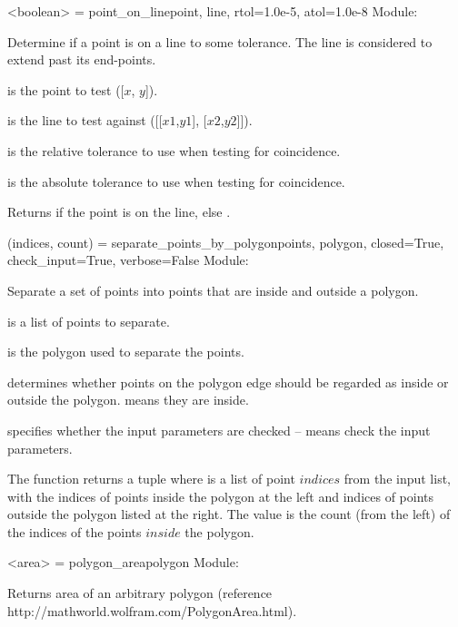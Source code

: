 \documentclass{manual}
\begin{document}
\label{ref:function_point_on_line}
\begin{funcdesc}{<boolean> = point_on_line}{point, line, rtol=1.0e-5, atol=1.0e-8}
Module: 

Determine if a point is on a line to some tolerance.  The line is considered to
extend past its end-points.

 is the point to test ([$x$, $y$]).

 is the line to test  against ([[$x1$,$y1$], [$x2$,$y2$]]).

 is the relative tolerance to use when testing for coincidence.

 is the absolute tolerance to use when testing for coincidence.

Returns  if the point is on the line, else .
\end{funcdesc}

\label{ref:function_separate_points_by_polygon}
\begin{funcdesc}{(indices, count) = separate_points_by_polygon}{points, polygon,
                                             closed=True,
                                             check_input=True,
                                             verbose=False}
Module: 

Separate a set of points into points that are inside and outside a polygon.

 is a list of points to separate.

 is the polygon used to separate the points.

 determines whether points on the polygon edge should be
regarded as inside or outside the polygon.   means they are inside.

 specifies whether the input parameters are checked -- 
means check the input parameters.

The function returns a tuple  where  is a list of 
point $indices$ from the input  list, with the indices of points inside the
polygon at the left and indices of points outside the polygon listed at the right.  The 
 value is the count (from the left) of the indices of the points $inside$ the
polygon.
\end{funcdesc}

\begin{funcdesc}{<area> = polygon_area}{polygon}
Module: 

Returns area of an arbitrary polygon (reference http://mathworld.wolfram.com/PolygonArea.html).
\end{funcdesc}
\end{document}
